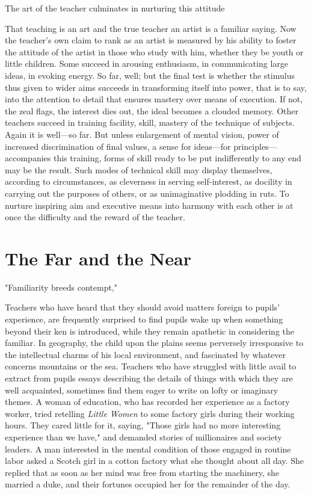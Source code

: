 \documentclass[letterpaper]{book}
\begin{document}
The art of the teacher culminates in nurturing this attitude

That teaching is an art and the true teacher an artist is a familiar
saying. Now the teacher's own claim to rank as an artist is measured by
his ability to foster the attitude of the artist in those who study with
him, whether they be youth or little children. Some succeed in arousing
enthusiasm, in communicating large ideas, in evoking energy. So far,
well; but the final test is whether the stimulus thus given to wider
aims succeeds in transforming itself into power, that is to say, into
the attention to detail that ensures mastery over means of execution. If
not, the zeal flags, the interest dies out, the ideal becomes a clouded
memory. Other teachers succeed in training facility, skill, mastery of
the technique of subjects. Again it is well---so far. But unless
enlargement of mental vision, power of increased discrimination of final
values, a sense for ideas---for principles---accompanies this training,
forms of skill ready to be put indifferently to any end may be the
result. Such modes of technical skill may display themselves,
according
to circumstances, as cleverness in serving self-interest, as docility in
carrying out the purposes of others, or as unimaginative plodding in
ruts. To nurture inspiring aim and executive means into harmony with
each other is at once the difficulty and the reward of the teacher.

\section{The Far and the Near}

"Familiarity breeds contempt,"

Teachers who have heard that they should avoid matters foreign to
pupils' experience, are frequently surprised to find pupils wake up when
something beyond their ken is introduced, while they remain apathetic in
considering the familiar. In geography, the child upon the plains seems
perversely irresponsive to the intellectual charms of his local
environment, and fascinated by whatever concerns mountains or the sea.
Teachers who have struggled with little avail to extract from pupils
essays describing the details of things with which they are well
acquainted, sometimes find them eager to write on lofty or imaginary
themes. A woman of education, who has recorded her experience as a
factory worker, tried retelling \emph{Little Women} to some factory
girls during their working hours. They cared little for it, saying,
"Those girls had no more interesting experience than we have," and
demanded stories of millionaires and society leaders. A man interested
in the mental condition of those engaged in routine labor asked a Scotch
girl in a cotton factory what she thought about all day. She replied
that as soon as her mind was free from starting the machinery, she
married a duke, and their fortunes occupied her for the remainder of the
day.
\end{document}
